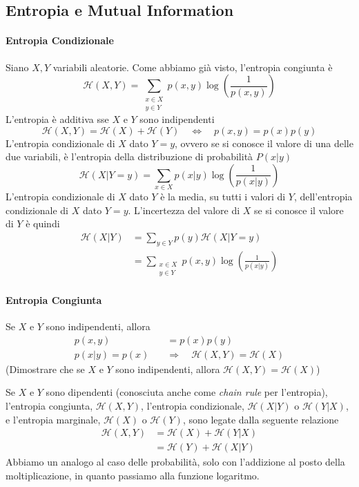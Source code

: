 \subsection{Entropia e Mutual Information}

\paragraph{Entropia Condizionale}
Siano $X,Y$ variabili aleatorie. Come abbiamo già visto, l'entropia congiunta è 
$$
    \mathcal{H}(X,Y) = \sum_{\substack{x\in X\\y\in Y}} p(x,y)\log \left(\frac{1}{p(x,y)}\right)
$$
L'entropia è additiva sse $X$ e $Y$ sono indipendenti
$$
    \mathcal{H}(X,Y) = \mathcal{H}(X) + \mathcal{H}(Y)
    \quad \Leftrightarrow \quad
    p(x,y) = p(x)p(y)
$$
L'entropia condizionale di $X$ dato $Y=y$, ovvero se si conosce il valore di una delle due variabili, è l'entropia della distribuzione di probabilità $P(x|y)$
$$
    \mathcal{H}(X|Y=y) = \sum_{x\in X} p(x|y)\log \left(\frac{1}{p(x|y)}\right)
$$
L'entropia condizionale di $X$ dato $Y$ è la media, su tutti i valori di $Y$, dell'entropia condizionale di $X$ dato $Y=y$.
L'incertezza del valore di $X$ se si conosce il valore di $Y$ è quindi
\begin{align*}
    \mathcal{H}(X|Y) &= \sum_{y\in Y} p(y)\mathcal{H}(X|Y=y)\\
    &= \sum_{\substack{x\in X\\y\in Y}} p(x,y)\log \left(\frac{1}{p(x|y)}\right)
\end{align*}

\paragraph{Entropia Congiunta} %
Se $X$ e $Y$ sono indipendenti, allora
\begin{align*}
    p(x,y) &= p(x)p(y)\\
    p(x|y) = p(x) \quad &\Rightarrow \quad \mathcal{H}(X,Y) = \mathcal{H}(X)
\end{align*}
(Dimostrare che se $X$ e $Y$ sono indipendenti, allora $\mathcal{H}(X,Y) = \mathcal{H}(X)$)

Se $X$ e $Y$ sono dipendenti (conosciuta anche come \emph{chain rule} per l'entropia), l'entropia congiunta, $\mathcal{H}(X,Y)$, l'entropia condizionale, $\mathcal{H}(X|Y)$ o $\mathcal{H}(Y|X)$, e l'entropia marginale, $\mathcal{H}(X)$ o $\mathcal{H}(Y)$, sono legate dalla seguente relazione
\begin{align*}
    \mathcal{H}(X,Y) &= \mathcal{H}(X) + \mathcal{H}(Y|X)\\
    &= \mathcal{H}(Y) + \mathcal{H}(X|Y)
\end{align*}
Abbiamo un analogo al caso delle probabilità, solo con l'addizione al posto della moltiplicazione, in quanto passiamo alla funzione logaritmo.


